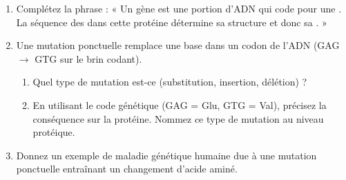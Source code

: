 \documentclass[11pt]{article}
\begin{document}
\begin{exercice}
\begin{enumerate}
    \item Complétez la phrase : « Un gène est une portion d'ADN qui code pour une \underline{\hspace{4cm}}. La séquence des \underline{\hspace{3cm}} dans cette protéine détermine sa structure \underline{\hspace{3cm}} et donc sa \underline{\hspace{3cm}}. »
    \item Une mutation ponctuelle remplace une base dans un codon de l'ADN (GAG $\rightarrow$ GTG sur le brin codant). 
    \begin{enumerate}
        \item Quel type de mutation est-ce (substitution, insertion, délétion) ?
        \item En utilisant le code génétique (GAG = Glu, GTG = Val), précisez la conséquence sur la protéine. Nommez ce type de mutation au niveau protéique.
    \end{enumerate}
    \item Donnez un exemple de maladie génétique humaine due à une mutation ponctuelle entraînant un changement d'acide aminé.
\end{enumerate}
\end{exercice}
\end{document}

